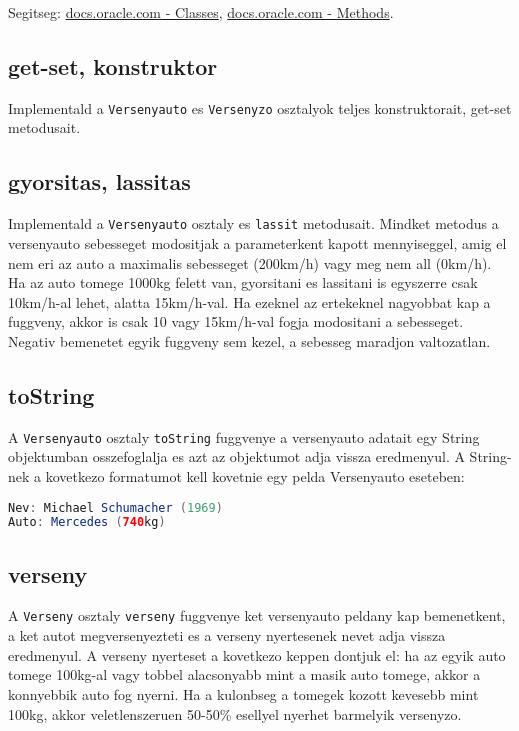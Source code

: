\documentclass{article}
\begin{document}
Segitseg: \href{https://docs.oracle.com/javase/tutorial/java/javaOO/classes.html}{docs.oracle.com - Classes}, \href{https://docs.oracle.com/javase/tutorial/java/javaOO/methods.html}{docs.oracle.com - Methods}.

\subsection{get-set, konstruktor}
Implementald a \lstinline{Versenyauto} es \lstinline{Versenyzo} osztalyok teljes konstruktorait, get-set metodusait.

\subsection{gyorsitas, lassitas}
Implementald a \lstinline{Versenyauto} osztaly  es \lstinline{lassit} metodusait. Mindket metodus a versenyauto sebesseget modositjak a parameterkent kapott mennyiseggel, amig el nem eri az auto a maximalis sebesseget (200km/h) vagy meg nem all (0km/h). Ha az auto tomege 1000kg felett van, gyorsitani es lassitani is egyszerre csak 10km/h-al lehet, alatta 15km/h-val. Ha ezeknel az ertekeknel nagyobbat kap a fuggveny, akkor is csak 10 vagy 15km/h-val fogja modositani a sebesseget. Negativ bemenetet egyik fuggveny sem kezel, a sebesseg maradjon valtozatlan.

\subsection{toString}
A \lstinline{Versenyauto} osztaly \lstinline{toString} fuggvenye a versenyauto adatait egy String objektumban osszefoglalja es azt az objektumot adja vissza eredmenyul. A String-nek a kovetkezo formatumot kell kovetnie egy pelda Versenyauto eseteben:

\begin{lstlisting}[language=Java, caption=Pelda toString kimenet]
Nev: Michael Schumacher (1969)
Auto: Mercedes (740kg)
\end{lstlisting}

\subsection{verseny}
A \lstinline{Verseny} osztaly \lstinline{verseny} fuggvenye ket versenyauto peldany kap bemenetkent, a ket autot megversenyezteti es a verseny nyertesenek nevet adja vissza eredmenyul. A verseny nyerteset a kovetkezo keppen dontjuk el: ha az egyik auto tomege 100kg-al vagy tobbel alacsonyabb mint a masik auto tomege, akkor a konnyebbik auto fog nyerni. Ha a kulonbseg a tomegek kozott kevesebb mint 100kg, akkor veletlenszeruen 50-50\% esellyel nyerhet barmelyik versenyzo.
\end{document}
